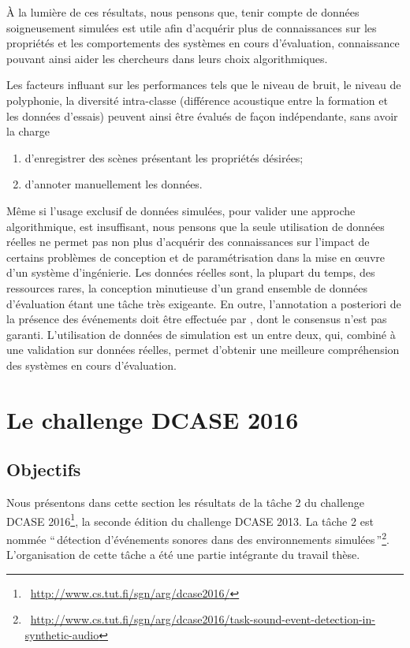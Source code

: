 À la lumière de ces résultats, nous pensons que, tenir compte de données soigneusement simulées est utile afin d'acquérir plus de connaissances sur les propriétés et les comportements des systèmes en cours d'évaluation, connaissance pouvant ainsi aider les chercheurs dans leurs choix algorithmiques. 

Les facteurs influant sur les performances tels que le niveau de bruit, le niveau de  polyphonie, la diversité intra-classe (différence acoustique entre la formation et les données d'essais) peuvent ainsi être évalués de façon indépendante, sans avoir la charge 

\begin{enumerate}
\item d'enregistrer des scènes présentant les propriétés désirées;
\item d'annoter manuellement les données.
\end{enumerate}

Même si l'usage exclusif de données simulées, pour valider une approche algorithmique, est insuffisant, nous pensons que la seule utilisation de données réelles ne permet pas non plus d'acquérir des connaissances sur l'impact de certains problèmes de conception et de paramétrisation   dans la mise en œuvre d'un système d'ingénierie. Les données réelles sont, la plupart du temps, des ressources rares, la conception minutieuse d'un grand ensemble de données d'évaluation étant une tâche très exigeante. En outre, l'annotation a posteriori de la présence des événements doit être effectuée par  , dont le consensus n'est pas garanti. L'utilisation de données de simulation est un entre deux, qui, combiné à une validation sur données réelles, permet d'obtenir une meilleure compréhension des systèmes en cours d'évaluation. 

\section{Le challenge DCASE  2016}

\subsection{Objectifs}

Nous présentons dans cette section les résultats de la tâche 2 du challenge DCASE 2016\footnote{\cf~\url{http://www.cs.tut.fi/sgn/arg/dcase2016/}}, la seconde édition du challenge DCASE 2013. La tâche 2 est nommée ``\,détection d'événements sonores dans des environnements simulées\,''\footnote{\cf~\url{http://www.cs.tut.fi/sgn/arg/dcase2016/task-sound-event-detection-in-synthetic-audio}}. L'organisation de cette tâche a été une partie intégrante du travail thèse. 


